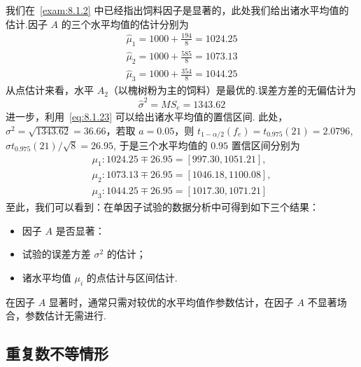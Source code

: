 \begin{example}
我们在~\ref{exam:8.1.2} 中已经指出饲料因子是显著的，此处我们给出诸水平均值的估计.因子 $A$ 的三个水平均值的估计分别为
  \begin{gather*} \hat{\mu}_{1} =1000+\frac{194}{8}=1024.25 \\ 
    \hat{\mu}_{2} =1000+\frac{585}{8}=1073.13 \\ 
    \hat{\mu}_{3} =1000+\frac{354}{8}=1044.25 
  \end{gather*}
从点估计来看，水平 $A_2$（以槐树粉为主的饲料）是最优的.误差方差的无偏估计为
\begin{equation}
  \hat{\sigma}^{2}=M S_{e}=1343.62
\end{equation}
进一步，利用~\ref{eq:8.1.23} 可以给出诸水平均值的置信区间. 此处，$\sigma^2=\sqrt{1343.62}=
36.66$，若取 $a=0.05$，则 $t_{1-\alpha/2} (f_e)=t_{0.975}(21)=2.0796$, $\hat{\sigma} t_{0.975}(21)/\sqrt{8}=26.95$, 于是三个水平均值的 $0.95$ 置信区间分别为
\begin{gather*}
  \mu_{1} : 1024.25 \mp 26.95 = [997.30, 1051.21],\\
  \mu_{2} : 1073.13 \mp 26.95=[1046.18,1100.08],\\
  \mu_{3} : 1044.25 \mp 26.95=[1017.30,1071.21]
\end{gather*}
至此，我们可以看到：在单因子试验的数据分析中可得到如下三个结果：
\begin{itemize}
  \item 因子 $A$ 是否显著：
  \item 试验的误差方差 $\sigma^2$ 的估计；
  \item 诸水平均值 $\mu_i$ 的点估计与区间估计.
\end{itemize}

在因子 $A$ 显著时，通常只需对较优的水平均值作参数估计，在因子 $A$ 不显著场合，参数估计无需进行.
\end{example}
\subsection{重复数不等情形}

